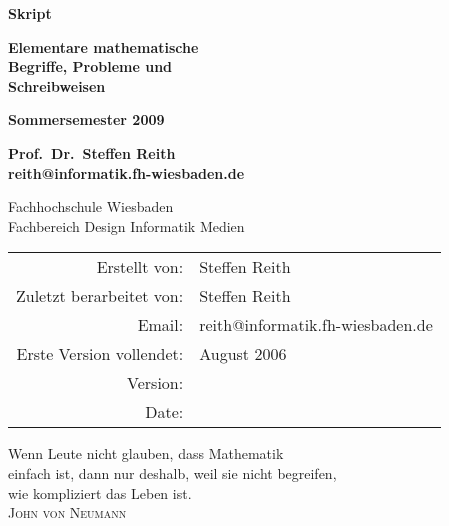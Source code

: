 \documentclass[11pt, a4paper, twoside]{scrartcl}
\makeatletter
\newcommand{\docutyp}{Skript}
\newcommand{\lecture}{Elementare mathematische\\ Begriffe, Probleme und\\[0.5\bigskipamount] Schreibweisen}
\newcommand{\docudate}{Sommersemester 2009}
\newcommand{\institution}{{\Large Fachhochschule Wiesbaden}\\
                          Fachbereich Design Informatik Medien}
\newcommand{\lecturer}{Prof.~Dr.~Steffen Reith}
\newcommand{\lectureremail}{reith@informatik.fh-wiesbaden.de}
\newcommand{\writer}{Steffen Reith}
\newcommand{\reviser}{Steffen Reith}
\newcommand{\email}{reith@informatik.fh-wiesbaden.de}
\newcommand{\writtendate}{August 2006}
\makeatother
\begin{document}
\pagestyle{empty}

\begin{titlepage}


        \vspace{60pt}
	\begin{center}
		\vspace{20pt}
		\textbf{\Large {\docutyp}}
			
		\vspace{20pt}
		\textbf{\Huge \lecture}
			
		\vspace{20pt}
		\textbf{\docudate}

		\vspace{20pt}
		\textbf{\lecturer}\\
		\textbf{\lectureremail}
		
		\vspace{120pt}
		{\institution}\\
		
		\vfill			
		\vspace{20pt}
		\begin{tabular}[t]{rl}
			Erstellt von: & {\writer}\\
                        Zuletzt berarbeitet von: & {\reviser}\\
			Email: & {\email}\\
			Erste Version vollendet: & {\writtendate}\\
			Version: & {\svnInfoRevision}\\
			Date: & {\svnInfoDate}\\
		\end{tabular}
	\end{center}
	\newpage
\end{titlepage}

\cleardoublepage

\thispagestyle{empty}
\vspace{0.3\textheight} 
\begin{raggedleft}
Wenn Leute nicht glauben, dass Mathematik\\
einfach ist, dann nur deshalb, weil sie nicht begreifen,\\
wie kompliziert das Leben ist.\\[\medskipamount]
\hfill \textsc{John von Neumann}%
\end{raggedleft}
\end{document}
